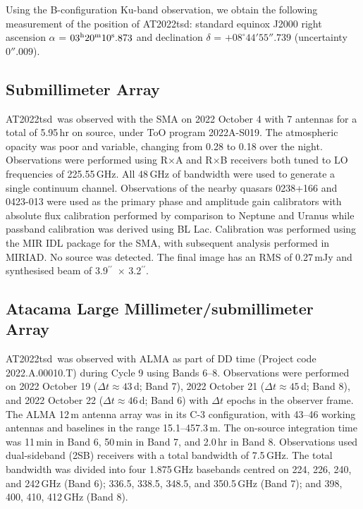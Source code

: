 \documentclass{nature_plusfigure}
\newcommand{\at}{AT2022tsd}
\newcommand{\arcsec}{$^{\prime\prime}$}
\begin{document}
\begin{methods}
Using the B-configuration Ku-band observation, we obtain the following measurement of the position of \at:
standard equinox J2000 right ascension $\alpha$ =
$03^{\rm{h}}20^{\rm{m}}10^{\rm{s}}.873$
and declination $\delta$ = $+08^{\circ} 44' 55''.739$ 
(uncertainty $0''.009$).

\subsection{Submillimeter Array}
\label{Methods:SMA}

\at\ was observed with the SMA on 2022 October 4 with 7 antennas for a total of 5.95\,hr on source, under ToO program 2022A-S019. The atmospheric opacity was poor and variable, changing from 0.28 to 0.18 over the night. Observations were performed using R$\times$A and R$\times$B receivers both tuned to LO frequencies of 225.55\,GHz. All 48\,GHz of bandwidth were used to generate a single continuum channel. Observations of the nearby quasars 0238+166 and 0423-013 were used as the primary phase and amplitude gain calibrators with absolute flux calibration performed by comparison to Neptune and Uranus while passband calibration was derived using BL Lac. Calibration was performed using the MIR IDL package for the SMA, with subsequent analysis performed in MIRIAD. No source was detected. The final image has an RMS of 0.27\,mJy and synthesised beam of 3.9\arcsec\ $\times$ 3.2\arcsec.

\subsection{Atacama Large Millimeter/submillimeter Array}
\label{sec:ALMA}

\at\ was observed with ALMA as part of DD time (Project code 2022.A.00010.T) during Cycle 9 using Bands 6--8. Observations were performed on 2022 October 19 ($\Delta t \approx 43$\,d; Band 7), 2022 October 21 ($\Delta t \approx 45$\,d; Band 8), and 2022 October 22 ($\Delta t \approx 46$\,d; Band 6) with $\Delta t$ epochs in the observer frame. The ALMA 12\,m antenna array was in its C-3 configuration, with
43--46 working antennas and baselines in the range 15.1--457.3\,m. The on-source integration time was
11\,min in Band 6, 50\,min in Band 7, and 2.0\,hr in Band 8.
Observations used dual-sideband (2SB) receivers with a total bandwidth of 7.5\,GHz. The total bandwidth was divided into four 1.875\,GHz basebands centred on 224, 226, 240, and 242\,GHz (Band 6);
336.5, 338.5, 348.5, and 350.5\,GHz (Band 7);
and 398, 400, 410, 412\,GHz (Band 8).


\end{methods}
\end{document}
